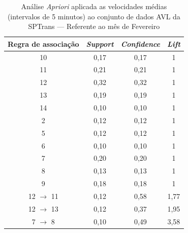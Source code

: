 \documentclass[
	12pt,				%
	oneside,			%
	a4paper,			%
	english,			%
	brazil				%
	]{abntex2ppgsi}
\begin{document}
{{{\begin{apendicesenv}
\begin{table}[!htb]
\centering
\caption {Análise \textit{Apriori} aplicada as velocidades médias (intervalos de 5 minutos) ao conjunto de dados AVL da SPTrans --- Referente ao mês de Fevereiro}
\label {tab:aprioriFebruary}
\begin{tabular}{c|c|c|c}
\toprule
\textbf{Regra de associação} & \textit{\textbf{Support}} & \textit{\textbf{Confidence}} & \textit{\textbf{Lift}} \\
\midrule
10 &  0,17 &  0,17 &  1\\
 \hline 
 11 &  0,21 &  0,21 &  1\\ 
 \hline 
 12 &  0,32 &  0,32 &  1\\ 
 \hline 
 13 &  0,19 &  0,19&  1\\ 
 \hline 
 14 &  0,10 &  0,10 &  1\\ 
 \hline 
 2 &  0,12 &  0,12 &  1\\ 
 \hline 
 5 &  0,12 &  0,12 &  1\\ 
 \hline 
 6 &  0,10 &  0,10 &  1\\ 
 \hline 
 7 &  0,20 &  0,20 &  1\\ 
 \hline 
 8 &  0,13 &  0,13 &  1\\ 
 \hline 
 9 &  0,18 &  0,18 &  1\\
  \hline 
 12 $\rightarrow$ 11 &  0,12 &  0,58 &  1,77\\ 
 \hline 
 12 $\rightarrow$ 13 &  0,12 &  0,37 &  1,95\\ 
 \hline 7 $\rightarrow$ 8 &  0,10 &  0,49 &  3,58\\
\bottomrule
\end{tabular}
\end{table}


\end{apendicesenv}}}}
\end{document}
